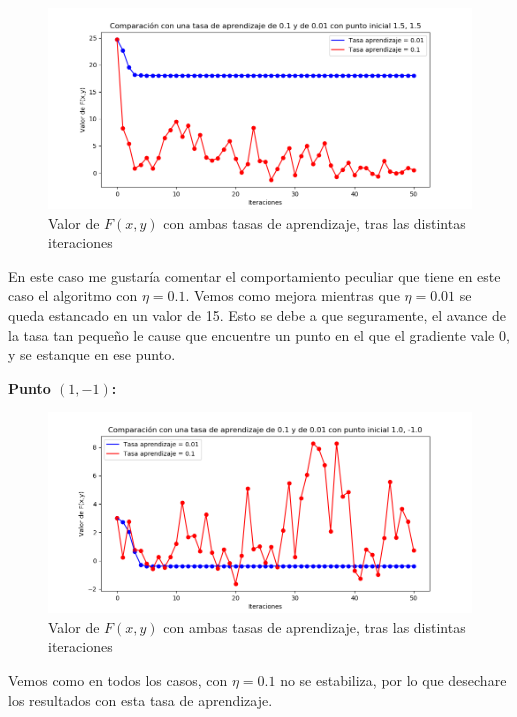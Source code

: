 \documentclass[12pt, spanish]{article}
\begin{document}
\begin{figure}[H]
  \centering
      \includegraphics[scale = 0.70]{ej1-3-15-15.png}
 		 \caption{Valor de $F(x,y)$ con ambas tasas de aprendizaje, tras las distintas iteraciones}
  		\label{fig:ej1-3-15-15}

\end{figure}

En este caso me gustaría comentar el comportamiento peculiar que tiene en este caso el algoritmo con $\eta = 0.1$. Vemos como mejora mientras que $\eta = 0.01$ se queda estancado en un valor de 15. Esto se debe a que seguramente, el avance de la tasa tan pequeño le cause que encuentre un punto en el que el gradiente vale 0, y se estanque en ese punto.

\textbf{Punto $(1, -1)$:}

\begin{figure}[H]
  \centering
      \includegraphics[scale = 0.70]{ej1-3-1-1-ite.png}
 		 \caption{Valor de $F(x,y)$ con ambas tasas de aprendizaje, tras las distintas iteraciones}
  		\label{fig:ej1-3-1-1-ite2}

\end{figure}


Vemos como en todos los casos, con $\eta = 0.1$ no se estabiliza, por lo que desechare los resultados con esta tasa de aprendizaje.
\end{document}
